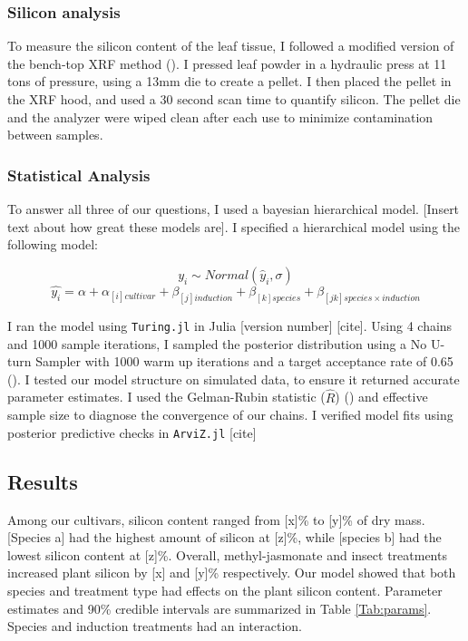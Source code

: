 \documentclass[12pt, letterpaper, ]{article}
\begin{document}
\subsubsection{Silicon analysis}

To measure the silicon content of the leaf tissue, I followed a modified version of the bench-top XRF method (\cite{reidinger_rapid_2012}). I pressed leaf powder in a hydraulic press at 11 tons of pressure, using a 13mm die to create a pellet. I then placed the pellet in the XRF hood, and used a 30 second scan time to quantify silicon. The pellet die and the analyzer were wiped clean after each use to minimize contamination between samples.

\subsubsection{Statistical Analysis}

To answer all three of our questions, I used a bayesian hierarchical model. [Insert text about how great these models are]. I specified a hierarchical model using the following model:

\[y_i \sim Normal(\hat{y}_i, \sigma)\]
\[\hat{y_i} = \alpha + \alpha_{[i]cultivar} + \beta_{[j]induction} + \beta_{[k]species} + \beta_{[jk]species \times induction}\]

I ran the model using \verb|Turing.jl| in Julia [version number] [cite]. Using 4 chains and 1000 sample iterations, I sampled the posterior distribution using a No U-turn Sampler with 1000 warm up iterations and a target acceptance rate of 0.65 (\cite{hoffman_no-u-turn_2014}). I tested our model structure on simulated data, to ensure it returned accurate parameter estimates. I used the Gelman-Rubin statistic (\( \hat{R} \)) (\cite{gelman_inference_1992}) and effective sample size to diagnose the convergence of our chains. I verified model fits using posterior predictive checks in \verb|ArviZ.jl| [cite] 

\subsection{Results}

Among our cultivars, silicon content ranged from [x]\% to [y]\% of dry mass. [Species a] had the highest amount of silicon at [z]\%, while [species b] had the lowest silicon content at [z]\%. Overall, methyl-jasmonate and insect treatments increased plant silicon by [x] and [y]\% respectively. Our model showed that both species and treatment type had effects on the plant silicon content. Parameter estimates and 90\% credible intervals are summarized in Table \ref{Tab:params}. Species and induction treatments had an interaction. 
\end{document}
